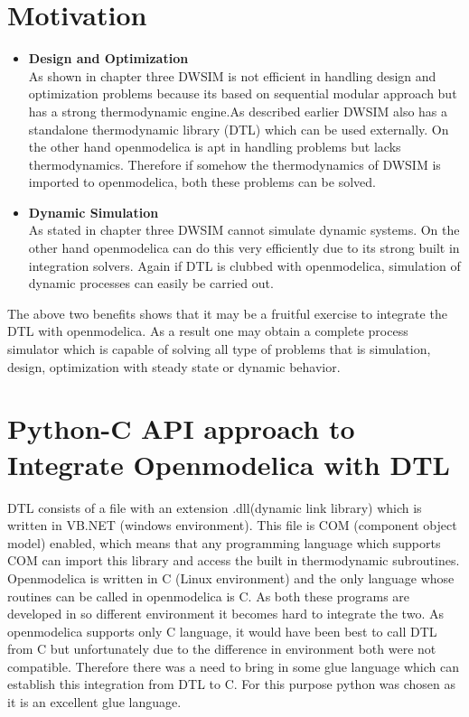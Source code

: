 \documentclass[12pt]{report}
\begin{document}
\section{Motivation}
\begin{itemize}
\item{\textbf{Design and Optimization}} \\
As shown in chapter three DWSIM is not efficient in handling design and optimization problems because its based on sequential modular approach but has a strong thermodynamic engine.As described earlier DWSIM also has a standalone thermodynamic library (DTL) which can be used externally. On the other hand openmodelica is apt in handling problems but lacks thermodynamics. Therefore if somehow the thermodynamics of DWSIM is imported to openmodelica, both these problems can be solved.

\item{\textbf{Dynamic Simulation}} \\
As stated in chapter three DWSIM cannot simulate dynamic systems. On the other hand openmodelica can do this very efficiently due to its strong built in integration solvers. Again if DTL is clubbed with openmodelica, simulation of dynamic processes can easily be carried out.

\end{itemize}
The above two benefits shows that it may be a fruitful exercise to integrate the DTL with openmodelica. As a result one may obtain a complete process simulator which is capable of solving all type of problems that is simulation, design, optimization with steady state or dynamic behavior.

\section{Python-C API approach to Integrate Openmodelica with DTL}
DTL consists of a file with an extension .dll(dynamic link library) which is written in VB.NET (windows environment). This file is COM (component object model) enabled, which means that any programming language which supports COM can import this library and access the built in thermodynamic subroutines. Openmodelica is written in C (Linux environment) and the only language whose routines can be called in openmodelica is C. As both these programs are developed in so different environment it becomes hard to integrate the two.
As openmodelica supports only C language, it would have been best to call DTL from C but unfortunately due to the difference in environment both were not compatible. Therefore there was a need to bring in some glue language which can establish this integration from DTL to C. For this purpose python was chosen as it is an excellent glue language.
\end{document}

